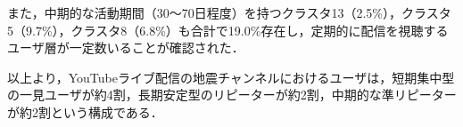また，中期的な活動期間（30〜70日程度）を持つクラスタ13（2.5\%），クラスタ5（9.7\%），クラスタ8（6.8\%）も合計で19.0\%存在し，定期的に配信を視聴するユーザ層が一定数いることが確認された．

以上より，YouTubeライブ配信の地震チャンネルにおけるユーザは，短期集中型の一見ユーザが約4割，長期安定型のリピーターが約2割，中期的な準リピーターが約2割という構成である．








